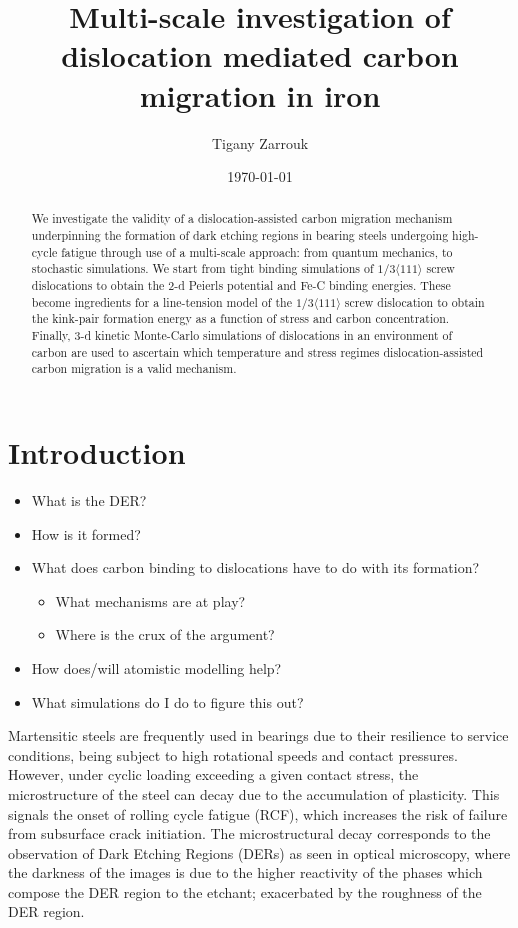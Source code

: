 \documentclass[a4paper]{article}
\author{Tigany Zarrouk}
\date{\today}
\title{Multi-scale investigation of dislocation mediated carbon migration in iron}
\begin{document}
\maketitle
\tableofcontents

\begin{abstract}

We investigate the validity of a dislocation-assisted carbon migration
mechanism underpinning the formation of dark etching regions in
bearing steels undergoing high-cycle fatigue through use of a
multi-scale approach: from quantum mechanics,
to stochastic simulations. We start from tight binding simulations of
$1/3\langle 111 \rangle$ screw dislocations to obtain the 2-d Peierls
potential and Fe-C binding energies. These become ingredients for a line-tension
model of the $1/3\langle 111 \rangle$ screw dislocation to obtain the kink-pair formation
energy as a function of stress and carbon concentration. Finally,
3-d kinetic Monte-Carlo simulations of dislocations in an environment
of carbon are used to ascertain which temperature and stress regimes
dislocation-assisted carbon migration is a valid mechanism. 

\end{abstract}


\section{Introduction}
\label{sec:orged5d696}

\begin{itemize}
\item What is the DER?
\item How is it formed?
\item What does carbon binding to dislocations have to do with its formation?
\begin{itemize}
\item What mechanisms are at play?
\item Where is the crux of the argument?
\end{itemize}
\item How does/will atomistic modelling help?
\item What simulations do I do to figure this out?
\end{itemize}



Martensitic steels are frequently used in bearings due to their resilience to service conditions,
being subject to high rotational speeds and contact pressures. However, under cyclic loading
exceeding a given contact stress, the microstructure of the steel can decay due to the accumulation
of plasticity. This signals the onset of rolling cycle fatigue (RCF), which increases the risk of
failure from subsurface crack initiation. The microstructural decay corresponds to the observation
of Dark Etching Regions (DERs) as seen in optical microscopy, where the darkness of the images is due
to the higher reactivity of the phases which compose the DER region to the etchant; exacerbated by
the roughness of the DER region.
\end{document}
